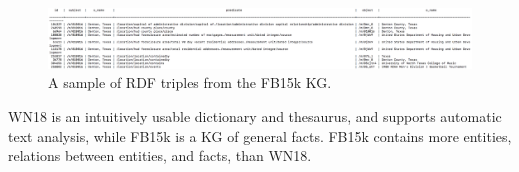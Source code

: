 \bigskip
\bigskip
\bigskip
\bigskip

\begin{figure}[H]
   	\centering
    	\includegraphics[width=1.0\textwidth, height=0.4\textwidth]{fb15k_fact_sample}
	\captionsetup{justification=centering}
	\caption{A sample of RDF triples from the FB15k KG.}
\end{figure}

\noindent WN18 is an intuitively usable dictionary and thesaurus, and supports automatic text analysis, while FB15k is a KG of general facts. FB15k contains more entities, relations between entities, and facts, than WN18.



